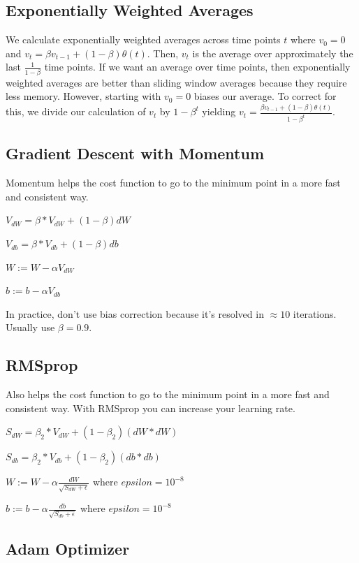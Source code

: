 \subsection{Exponentially Weighted Averages}

We calculate exponentially weighted averages across time points $t$ where $v_0 = 0$ and $v_t = \beta v_{t-1} + (1 - \beta) \theta (t)$. Then, $v_t$ is the average over approximately the last $\frac{1}{1 - \beta}$ time points. If we want an average over time points, then exponentially weighted averages are better than sliding window averages because they require less memory. However, starting with $v_0 = 0$ biases our average. To correct for this, we divide our calculation of $v_t$ by $1 - \beta ^t$ yielding $v_t = \frac {\beta v_{t-1} + (1 - \beta) \theta (t)}{1 - \beta ^t}$.

\subsection{Gradient Descent with Momentum}

Momentum helps the cost function to go to the minimum point in a more fast and consistent way.

$V_{dW} = \beta * V_{dW} + (1 - \beta) dW$

$V_{db} = \beta * V_{db} + (1 - \beta) db$

$W := W - \alpha V_{dW}$

$b := b - \alpha V_{db}$

In practice, don't use bias correction because it's resolved in $\approx 10$ iterations. Usually use $\beta = 0.9$.

\subsection{RMSprop}

Also helps the cost function to go to the minimum point in a more fast and consistent way. With RMSprop you can increase your learning rate.

$S_{dW} = \beta_2 * V_{dW} + (1 - \beta_2) (dW * dW)$

$S_{db} = \beta_2 * V_{db} + (1 - \beta_2) (db * db)$

$W := W - \alpha \frac{dW}{\sqrt{S_{dW} + \epsilon}}$ where $epsilon = 10^{-8}$

$b := b - \alpha \frac{db}{\sqrt{S_{db} + \epsilon}}$ where $epsilon = 10^{-8}$

\subsection{Adam Optimizer}

